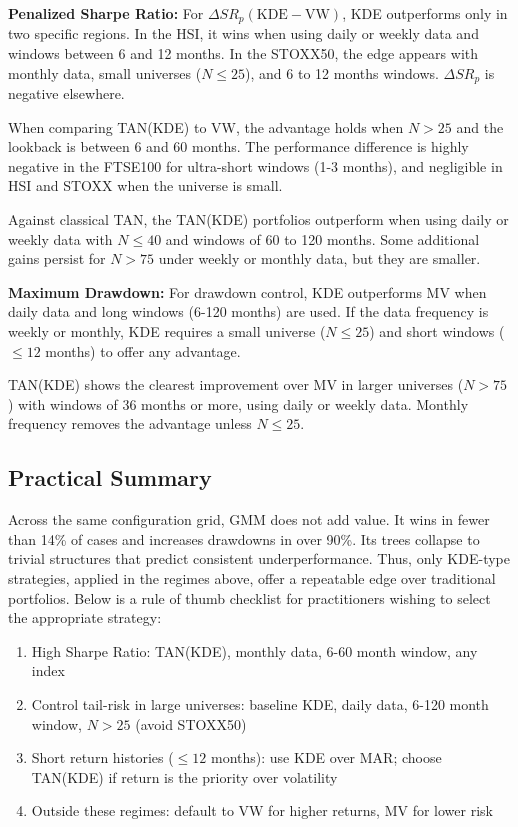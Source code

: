 \newpage
\textbf{Penalized Sharpe Ratio:}
For $\Delta SR_{p}(\text{KDE} - \text{VW})$, KDE outperforms only in two specific regions. In the HSI, it wins when using daily or weekly data and windows between 6 and 12 months. In the STOXX50, the edge appears with monthly data, small universes ($N \le 25$), and 6 to 12 months windows. $\Delta SR_{p}$ is negative elsewhere.

When comparing TAN(KDE) to VW, the advantage holds when $N > 25$ and the lookback is between 6 and 60 months. The performance difference is highly negative in the FTSE100 for ultra-short windows (1-3 months), and negligible in HSI and STOXX when the universe is small.

Against classical TAN, the TAN(KDE) portfolios outperform when using daily or weekly data with $N \le 40$ and windows of 60 to 120 months. Some additional gains persist for $N > 75$ under weekly or monthly data, but they are smaller.

\textbf{Maximum Drawdown:}
For drawdown control, KDE outperforms MV when daily data and long windows (6-120 months) are used. If the data frequency is weekly or monthly, KDE requires a small universe ($N \le 25$) and short windows ($\le 12$ months) to offer any advantage.

TAN(KDE) shows the clearest improvement over MV in larger universes ($N > 75$) with windows of 36 months or more, using daily or weekly data. Monthly frequency removes the advantage unless $N \le 25$.

\subsection{Practical Summary}
Across the same configuration grid, GMM does not add value. It wins in fewer than 14\% of cases and increases drawdowns in over 90\%. Its trees collapse to trivial structures that predict consistent underperformance. Thus, only KDE-type strategies, applied in the regimes above, offer a repeatable edge over traditional portfolios. Below is a rule of thumb checklist for practitioners wishing to select the appropriate strategy:

\begin{enumerate}
\item High Sharpe Ratio: TAN(KDE), monthly data, 6-60 month window, any index  
\item Control tail-risk in large universes: baseline KDE, daily data, 6-120 month window, $N > 25$ (avoid STOXX50)
\item Short return histories ($\le 12$ months): use KDE over MAR; choose TAN(KDE) if return is the priority over volatility
\item Outside these regimes: default to VW for higher returns, MV for lower risk
\end{enumerate}

